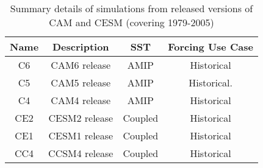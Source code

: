 

\begin{table}[t]
\caption{Summary details of simulations from released versions of CAM and CESM (covering 1979-2005)}\label{t1}
\begin{center}
\begin{tabular}{cccc}
\hline
Name & Description & SST  & Forcing Use Case \\
\hline 
C6 & CAM6 release                           & AMIP     & Historical  \\
C5 & CAM5 release                           & AMIP     & Historical. \\
C4 & CAM4 release                           & AMIP     & Historical  \\
CE2 & CESM2 release                         & Coupled  & Historical  \\
CE1 & CESM1 release                         & Coupled  & Historical  \\
CC4 & CCSM4 release                         & Coupled  & Historical  \\
\hline
\end{tabular}
\end{center}
\end{table}

\clearpage

